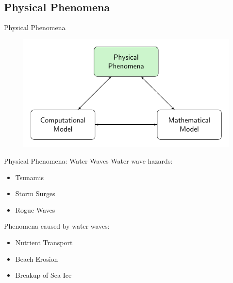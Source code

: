 \documentclass[pdf]{beamer}
\begin{document}
\subsection{Physical Phenomena}
\begin{frame}{Physical Phenomena}
	\begin{figure}
		\includegraphics[width=\textwidth]{./Pics/ModelDiagrams/FlowChartHigh1G.pdf}
	\end{figure}
\end{frame}
\begin{frame}{Physical Phenomena: Water Waves}
	Water wave hazards:
		\begin{itemize}
			\item Tsunamis
			\item Storm Surges
			\item Rogue Waves
		\end{itemize}
	\smallskip
	\pause
	Phenomena caused by water waves:
		\begin{itemize}
			\item Nutrient Transport
			\item Beach Erosion
			\item Breakup of Sea Ice
		\end{itemize}
\end{frame}
\end{document}
